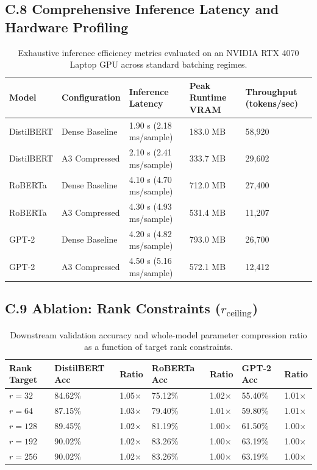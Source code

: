 \subsection{C.8 Comprehensive Inference Latency and Hardware Profiling}
\label{sec:app_inference_profiling}

\begin{table}[H]
\centering
\small
\begin{tabular}{lllll}
\toprule
\textbf{Model} & \textbf{Configuration} & \textbf{Inference Latency} & \textbf{Peak Runtime VRAM} & \textbf{Throughput (tokens/sec)} \\
\midrule
DistilBERT & Dense Baseline & 1.90 s (2.18 ms/sample) & 183.0 MB & 58,920 \\
DistilBERT & A3 Compressed & 2.10 s (2.41 ms/sample) & 333.7 MB & 29,602 \\
RoBERTa    & Dense Baseline & 4.10 s (4.70 ms/sample) & 712.0 MB & 27,400 \\
RoBERTa    & A3 Compressed & 4.30 s (4.93 ms/sample) & 531.4 MB & 11,207 \\
GPT-2      & Dense Baseline & 4.20 s (4.82 ms/sample) & 793.0 MB & 26,700 \\
GPT-2      & A3 Compressed & 4.50 s (5.16 ms/sample) & 572.1 MB & 12,412 \\
\bottomrule
\end{tabular}
\caption{Exhaustive inference efficiency metrics evaluated on an NVIDIA RTX 4070 Laptop GPU across standard batching regimes.}
\label{tab:app_inference_efficiency}
\end{table}

\subsection{C.9 Ablation: Rank Constraints ($r_{\mathrm{ceiling}}$)}
\label{sec:app_rank_ablation}

\begin{table}[H]
\centering
\small
\begin{tabular}{lllllll}
\toprule
\textbf{Rank Target} & \textbf{DistilBERT Acc} & \textbf{Ratio} & \textbf{RoBERTa Acc} & \textbf{Ratio} & \textbf{GPT-2 Acc} & \textbf{Ratio} \\
\midrule
$r = 32$  & 84.62\% & 1.05$\times$ & 75.12\% & 1.02$\times$ & 55.40\% & 1.01$\times$ \\
$r = 64$  & 87.15\% & 1.03$\times$ & 79.40\% & 1.01$\times$ & 59.80\% & 1.01$\times$ \\
$r = 128$ & 89.45\% & 1.02$\times$ & 81.19\% & 1.00$\times$ & 61.50\% & 1.00$\times$ \\
$r = 192$ & 90.02\% & 1.02$\times$ & 83.26\% & 1.00$\times$ & 63.19\% & 1.00$\times$ \\
$r = 256$ & 90.02\% & 1.02$\times$ & 83.26\% & 1.00$\times$ & 63.19\% & 1.00$\times$ \\
\bottomrule
\end{tabular}
\caption{Downstream validation accuracy and whole-model parameter compression ratio as a function of target rank constraints.}
\label{tab:app_rank_ablation}
\end{table}

